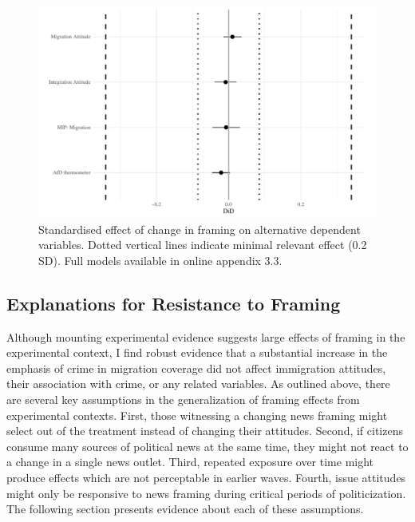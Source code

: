 \documentclass[
  12pt,
]{article}
\begin{document}
\begin{figure}[!ht]

{\centering \includegraphics{Manuscript_Framing_files/figure-latex/multidv-1} 

}

\caption{Standardised effect of change in framing on alternative dependent variables. Dotted vertical lines indicate minimal relevant effect (0.2 SD). Full models available in online appendix 3.3.}\label{fig:multidv}
\end{figure}

\hypertarget{explanations-for-resistance-to-framing}{%
\subsection{Explanations for Resistance to Framing}\label{explanations-for-resistance-to-framing}}

Although mounting experimental evidence suggests large effects of framing in the experimental context, I find robust evidence that a substantial increase in the emphasis of crime in migration coverage did not affect immigration attitudes, their association with crime, or any related variables. As outlined above, there are several key assumptions in the generalization of framing effects from experimental contexts. First, those witnessing a changing news framing might select out of the treatment instead of changing their attitudes. Second, if citizens consume many sources of political news at the same time, they might not react to a change in a single news outlet. Third, repeated exposure over time might produce effects which are not perceptable in earlier waves. Fourth, issue attitudes might only be responsive to news framing during critical periods of politicization. The following section presents evidence about each of these assumptions.
\end{document}
